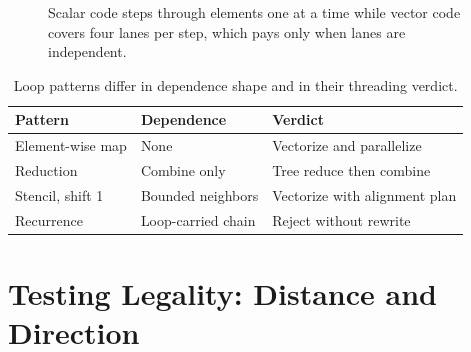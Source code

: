 \begin{figure}[htbp]
\centering
{}
\caption{Scalar code steps through elements one at a time while vector code covers four lanes per step, which pays only when lanes are independent.}
\label{fig:ch36-lanes}
\end{figure}

\begin{table}[htbp]
\centering
\caption{Loop patterns differ in dependence shape and in their threading verdict.}
\label{tab:ch36-patterns}
\begin{tabular}{lll}
\toprule
Pattern & Dependence & Verdict \\
\midrule
Element-wise map & None & Vectorize and parallelize \\
Reduction & Combine only & Tree reduce then combine \\
Stencil, shift 1 & Bounded neighbors & Vectorize with alignment plan \\
Recurrence & Loop-carried chain & Reject without rewrite \\
\bottomrule
\end{tabular}
\end{table}

\section{Testing Legality: Distance and Direction}\label{sec:ch36-legality}

